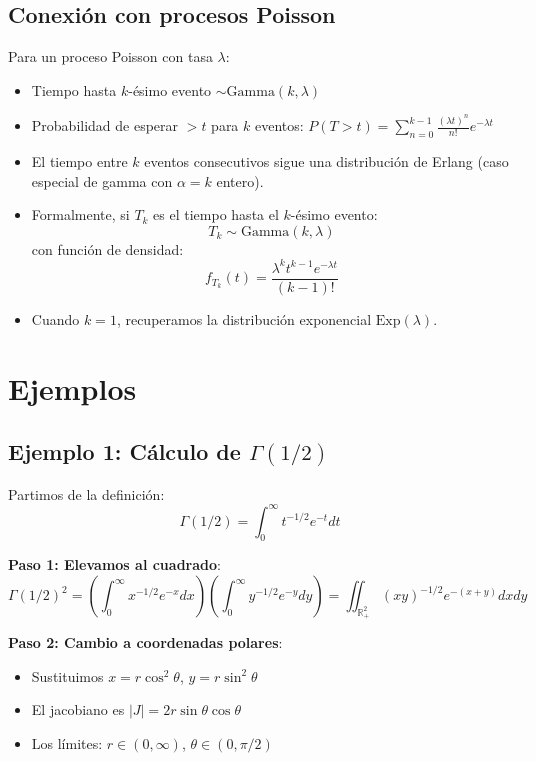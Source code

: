 \documentclass[letterpaper]{article}
\begin{document}
	\subsection{Conexión con procesos Poisson}
	Para un proceso Poisson con tasa $\lambda$:
	\begin{itemize}
		\item Tiempo hasta $k$-ésimo evento $\sim \text{Gamma}(k, \lambda)$
		\item Probabilidad de esperar $>t$ para $k$ eventos: $P(T > t) = \sum_{n=0}^{k-1} \frac{(\lambda t)^n}{n!} e^{-\lambda t}$

		\item El tiempo entre $k$ eventos consecutivos sigue una distribución de Erlang (caso especial de gamma con $\alpha=k$ entero).
		
		\item Formalmente, si $T_k$ es el tiempo hasta el $k$-ésimo evento:
		\[ T_k \sim \text{Gamma}(k, \lambda) \]
		con función de densidad:
		\[ f_{T_k}(t) = \frac{\lambda^k t^{k-1} e^{-\lambda t}}{(k-1)!} \]
		
		\item Cuando $k=1$, recuperamos la distribución exponencial $\text{Exp}(\lambda)$.
	\end{itemize}
	
	\section{Ejemplos}
	
	\subsection{Ejemplo 1: Cálculo de $\Gamma(1/2)$}
	Partimos de la definición:
	\[ \Gamma(1/2) = \int_0^\infty t^{-1/2} e^{-t} dt \]
	
	\textbf{Paso 1: Elevamos al cuadrado}:
	\[ \Gamma(1/2)^2 = \left( \int_0^\infty x^{-1/2} e^{-x} dx \right) \left( \int_0^\infty y^{-1/2} e^{-y} dy \right) = \iint_{\mathbb{R}_+^2} (xy)^{-1/2} e^{-(x+y)} dx dy \]
	
	\textbf{Paso 2: Cambio a coordenadas polares}:
	\begin{itemize}
		\item Sustituimos $x = r \cos^2 \theta$, $y = r \sin^2 \theta$
		\item El jacobiano es $|J| = 2r \sin \theta \cos \theta$
		\item Los límites: $r \in (0, \infty)$, $\theta \in (0, \pi/2)$
	\end{itemize}
	
\end{document}
